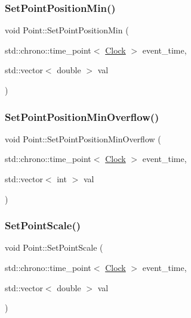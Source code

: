 \mbox{\label{classPoint_ad47980a6ed515a2def172d757af46f1a}} 
\subsubsection{\texorpdfstring{Set\+Point\+Position\+Min()}{SetPointPositionMin()}}
{\footnotesize\ttfamily void Point\+::\+Set\+Point\+Position\+Min (\begin{DoxyParamCaption}\item[{std\+::chrono\+::time\+\_\+point$<$ \mbox{\hyperlink{universe_8h_a0ef8d951d1ca5ab3cfaf7ab4c7a6fd80}{Clock}} $>$}]{event\+\_\+time,  }\item[{std\+::vector$<$ double $>$}]{val }\end{DoxyParamCaption})\hspace{0.3cm}{\ttfamily [inline]}}

\mbox{\label{classPoint_ab0c0a837abb8bd52a59f82723a31f61f}} 
\subsubsection{\texorpdfstring{Set\+Point\+Position\+Min\+Overflow()}{SetPointPositionMinOverflow()}}
{\footnotesize\ttfamily void Point\+::\+Set\+Point\+Position\+Min\+Overflow (\begin{DoxyParamCaption}\item[{std\+::chrono\+::time\+\_\+point$<$ \mbox{\hyperlink{universe_8h_a0ef8d951d1ca5ab3cfaf7ab4c7a6fd80}{Clock}} $>$}]{event\+\_\+time,  }\item[{std\+::vector$<$ int $>$}]{val }\end{DoxyParamCaption})\hspace{0.3cm}{\ttfamily [inline]}}

\mbox{\label{classPoint_a8fc02455a773624df80933403b0e545f}} 
\subsubsection{\texorpdfstring{Set\+Point\+Scale()}{SetPointScale()}}
{\footnotesize\ttfamily void Point\+::\+Set\+Point\+Scale (\begin{DoxyParamCaption}\item[{std\+::chrono\+::time\+\_\+point$<$ \mbox{\hyperlink{universe_8h_a0ef8d951d1ca5ab3cfaf7ab4c7a6fd80}{Clock}} $>$}]{event\+\_\+time,  }\item[{std\+::vector$<$ double $>$}]{val }\end{DoxyParamCaption})\hspace{0.3cm}{\ttfamily [inline]}}

